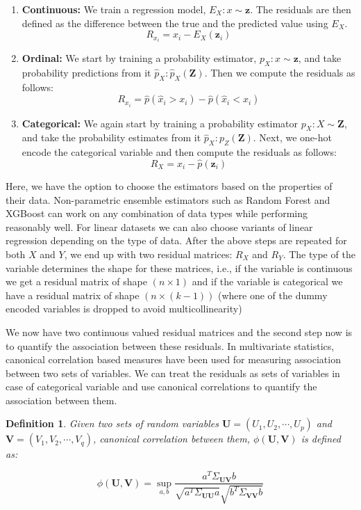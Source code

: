 \documentclass[letterpaper]{article} %
\newtheorem{definition}{Definition}
\begin{document}
\begin{enumerate}
	\item \textbf{Continuous:} We train a regression
		model, $ E_X: x \sim \bm{z} $. The residuals are then defined
		as the difference between the true and the predicted value using
		$ E_X $.
		$$ R_{x_i} = x_i - E_X(\bm{z}_i) $$
	\item \textbf{Ordinal:} We start by training a probability
		estimator, $ p_X: x \sim \bm{z} $, and take probability
		predictions from it $ \hat{p}_X: \hat{p}_X(\bm{Z}) $. Then we
		compute the residuals as follows:
		$$ R_{x_i} = \hat{p}(\hat{x}_i > x_i) - \hat{p}(\hat{x}_i < x_i) $$
	\item \textbf{Categorical:} We again start by training a
		probability estimator $ p_X: X \sim \bm{Z} $, and take the
		probability estimates from it $ \hat{p}_X: p_Z(\bm{Z}) $. Next,
		we one-hot encode the categorical variable and then compute the
		residuals as follows: 
		$$ R_X = x_i - \hat{p}(\bm{z}_i) $$
\end{enumerate}


Here, we have the option to choose the estimators based on the properties of
their data. Non-parametric ensemble estimators such as Random Forest and
XGBoost can work on any combination of data types while performing reasonably
well. For linear datasets we can also choose variants of linear regression
depending on the type of data. After the above steps are repeated for both $ X
$ and $ Y $, we end up with two residual matrices: $ R_X $ and $ R_Y $. The
type of the variable determines the shape for these matrices, i.e., if the
variable is continuous we get a residual matrix of shape $ ( n \times 1 ) $ and
if the variable is categorical we have a residual matrix of shape $ ( n \times
(k-1)) $ (where one of the dummy encoded variables is dropped to avoid
multicollinearity)

We now have two continuous valued residual matrices and the second step now is
to quantify the association between these residuals. In multivariate
statistics, canonical correlation based measures have been used for measuring
association between two sets of variables. We can treat the residuals as sets
of variables in case of categorical variable and use canonical correlations to
quantify the association between them.

\begin{definition}
	Given two sets of random variables $ \bm{U} = (U_1, U_2, \cdots, U_p) $
	and $ \bm{V} = (V_1, V_2, \cdots, V_q) $, canonical correlation between
	them, $\phi(\bm{U}, \bm{V}) $ is defined as:
		
	\begin{equation}
		\phi(\bm{U}, \bm{V}) = \sup_{a, b} \frac{a^T \Sigma_{\bm{U}\bm{V}} b}{\sqrt{a^T \Sigma_{\bm{U}\bm{U}} a} \sqrt{b^T \Sigma_{\bm{V}\bm{V}} b}}
	\end{equation}

\end{definition}
	
\end{document}
